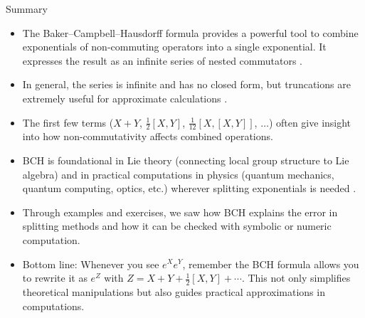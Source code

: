 \documentclass{beamer}
\begin{document}
\begin{frame}{Summary}
\begin{itemize}
\item The Baker–Campbell–Hausdorff formula provides a powerful tool to combine exponentials of non-commuting operators into a single exponential. It expresses the result as an infinite series of nested commutators .
\item In general, the series is infinite and has no closed form, but truncations are extremely useful for approximate calculations .
\item The first few terms ($X+Y$, $\frac{1}{2}[X,Y]$, $\frac{1}{12}[X,[X,Y]]$, $\dots$) often give insight into how non-commutativity affects combined operations.
\item BCH is foundational in Lie theory (connecting local group structure to Lie algebra) and in practical computations in physics (quantum mechanics, quantum computing, optics, etc.) wherever splitting exponentials is needed .
\item Through examples and exercises, we saw how BCH explains the error in splitting methods and how it can be checked with symbolic or numeric computation.
\item Bottom line: Whenever you see $e^X e^Y$, remember the BCH formula allows you to rewrite it as $e^Z$ with $Z = X+Y + \frac{1}{2}[X,Y] + \cdots$. This not only simplifies theoretical manipulations but also guides practical approximations in computations.
\end{itemize}
\end{frame}
\end{document}
